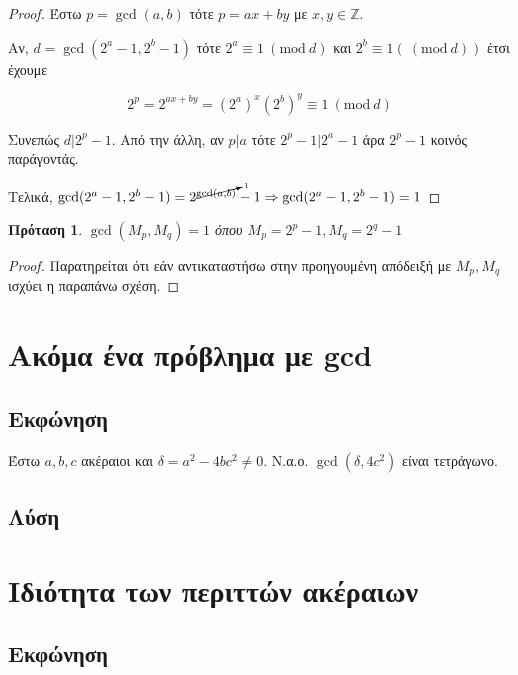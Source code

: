 \documentclass[oneside]{article}
\newtheorem*{lemma}{Πρόταση}
\newcommand{\Mod}[1]{\ (\mathrm{mod}\ #1)}
\begin{document}
\begin{proof}
    Έστω $p = \gcd(a,b)$ τότε $p = ax + by$ με $x, y \in \mathbb{Z}$.
    
    Αν, $d = \gcd(2^a-1,2^b-1)$ τότε $2^a \equiv 1 \Mod{d}$ και $2^b \equiv 1 (\Mod{d})$ έτσι έχουμε

    \begin{equation}
        2^p = 2^{ax+by} = (2^a)^x(2^b)^y \equiv 1 \Mod{d}
    \end{equation}

    Συνεπώς $d | 2^p - 1$.
    Από την άλλη, αν $p | a$ τότε $2^p - 1 | 2^a - 1$ άρα $2^p - 1$ κοινός παράγοντάς.
    
    Τελικά, $\gcd(2^a - 1, 2^b - 1) = 2^{\cancelto{1}{{\gcd(a,b)}}} - 1 \Rightarrow \gcd(2^a - 1, 2^b - 1) = 1$
\end{proof}

\begin{lemma}
    $\gcd(M_p, M_q) = 1$ όπου $M_p = 2^p - 1, M_q = 2^q - 1$
\end{lemma}

\begin{proof}
    Παρατηρείται ότι εάν αντικαταστήσω στην προηγουμένη απόδειξή με $M_p, M_q$ ισχύει η παραπάνω σχέση.
\end{proof}


\section{Ακόμα ένα πρόβλημα με gcd}

\subsection{Εκφώνηση}

Έστω $a, b, c$ ακέραιοι και $\delta = a^2 - 4bc^2 \neq 0$. Ν.α.ο. $\gcd(\delta, 4c^2)$ είναι τετράγωνο.

\subsection{Λύση} 


\section{Ιδιότητα των περιττών ακέραιων}

\subsection{Εκφώνηση}
\end{document}
